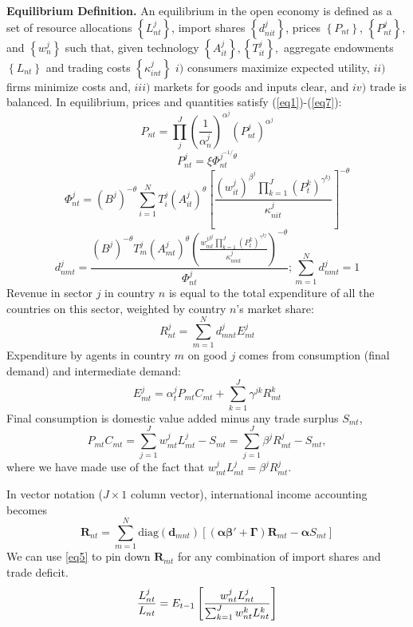 \documentclass[12pt]{article}
\begin{document}
\textbf{Equilibrium Definition. } An equilibrium in the open economy is
defined as a set of resource allocations $\left\{ L_{nt}^{j}\right\} $,
import shares $\left\{ d_{nit}^{j}\right\} $, prices $\left\{ P_{nt}\right\} 
$, $\left\{ P_{nt}^{j}\right\} $, and $\left\{ w_{n}^{j}\right\} $ such
that, given technology $\left\{ A_{it}^{j}\right\}
,\left\{T_{it}^{j}\right\} ,$ aggregate endowments $\left\{ L_{nt}\right\} $
and trading costs $\left\{ \kappa _{int}^{j}\right\} $ $i)$ consumers
maximize expected utility, $ii)$ firms minimize costs and, $iii)$ markets
for goods and inputs clear, and $iv)$ trade is balanced. In equilibrium,
prices and quantities satisfy (\ref{eq1})-(\ref{eq7}): 
\begin{equation}
P_{nt}=\prod_{j}^{J}\left( \frac{1}{\alpha _{n}^{j}}\right)
^{\alpha^{j}}\left( P_{nt}^{j}\right) ^{\alpha ^{j}}  \label{eq1}
\end{equation}
\begin{equation}
P_{nt}^{j}=\xi\Phi _{nt}^{j^{-1/}\theta }  \label{eq2}
\end{equation}
\begin{equation}
\Phi _{nt}^{j}=
	\left( B^{j}\right)^{-\theta}
	\sum_{i=1}^{N}
		T_{i}^{j}\left(A_{it}^{j}\right)^{\theta }
		\left[ 
			\frac
				{\left(w_{it}^{j}\right) ^{\beta ^{j}}	\prod_{k=1}^J (P_{t}^k)^{\gamma^{kj}}}
				{\kappa _{nit}^{j}}
		\right]^{-\theta }  \label{eq3}
\end{equation}
\begin{equation}
d_{nmt}^{j}=
	\frac
		{\left( B^{j}\right)^{-\theta}T_{m}^{j}\left(A_{mt}^{j}\right) ^{\theta }
		\left( 
			\frac
				{w_{mt}^{j\beta^{j}}\prod_{k=1}^J (P_{t}^k)^{\gamma^{kj}}}
				{\kappa _{nmt}^{j}}\right) ^{-\theta }}
		{\Phi_{nt}^{j}};
\sum\limits_{m=1}^{N}d_{nmt}^{j}=1  \label{eq4}
\end{equation}
Revenue in sector $j$ in country $n$ is equal to the total expenditure of all the countries on this sector, weighted by country $n$'s market share:
\[
R^j_{nt} =
	\sum_{m=1}^N
		d^j_{mnt}
		E^j_{mt}
\]
Expenditure by agents in country $m$ on good $j$ comes from consumption (final demand) and intermediate demand:
\[
E^j_{mt} =
	\alpha^j_t P_{mt}C_{mt}
	+ \sum_{k=1}^J \gamma^{jk}R^k_{mt}
\]
Final consumption is domestic value added minus any trade surplus $S_{mt}$,
\[
P_{mt}C_{mt} = \sum_{j=1}^J w_{mt}^jL_{mt}^j - S_{mt}
 = \sum_{j=1}^J \beta^j R_{mt}^j - S_{mt},
\]
where we have made use of the fact that $w^j_{mt}L^j_{mt} = \beta^j R^j_{mt}$.

In vector notation ($J\times1$ column vector), international income accounting becomes
\begin{equation}\label{eq5}
	\mathbf R_{nt} =
		\sum_{m=1}^N 
			\text{diag}(\mathbf d_{mnt})
			[
				(\boldsymbol{\alpha\beta}'+\boldsymbol\Gamma)
				\mathbf R_{mt}
				- \boldsymbol\alpha S_{mt}
			]
\end{equation}
We can use \eqref{eq5} to pin down $\mathbf R_{mt}$ for any combination of import shares and trade deficit. 
\begin{equation}
\frac{L_{nt}^{j}}{L_{nt}}=E_{t-1}\left[ \frac{w_{nt}^{j}L_{nt}^{j}}{%
\sum_{k=1}^J w_{nt}^{k}L_{nt}^{k}}\right]  \label{eq7}
\end{equation}
\end{document}
